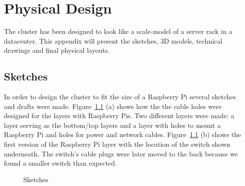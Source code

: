 \chapter{Physical Design}
\label{appendix_physical_design}
The cluster has been designed to look like a scale-model of a server rack in a datacenter. This appendix will present the sketches, 3D models, technical drawings and final physical layouts.


\section*{Sketches}
In order to design the cluster to fit the size of a Raspberry Pi several sketches and drafts were made. Figure~\ref{fig:sketches} (a) shows how the the cable holes were designed for the layers with Raspberry Pis. Two different layers were made: a layer serving as the bottom/top layers and a layer with holes to mount a Raspberry Pi and holes for power and network cables. Figure~\ref{fig:sketches} (b) shows the first version of the Raspberry Pi layer with the location of the switch shown underneath. The switch's cable plugs were later moved to the back because we found a smaller switch than expected. \\

\begin{figure}[H]%
    \centering
      \qquad
    \caption{Sketches}%
    \label{fig:sketches}%
\end{figure}


